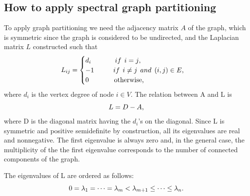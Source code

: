 \documentclass[]{usiinfbachelorproject}
\newcommand\tab[1][1cm]{\hspace*{#1}}
\begin{document}

\subsection{How to apply spectral graph partitioning}
To apply graph partitioning we need the adjacency matrix $A$ of the graph, which is symmetric since the graph is considered to be undirected, and the Laplacian matrix $L$ constructed such that
\begin{equation}\notag
L_{ij} = 
\begin{cases}
d_i \tab \:\:\: if \:\: i=j \text{,}\\
-1 \tab if \:\: i \neq j \:\: and \: \: (i,j) \in E \text{,}\\
0 \tab \:\:\:\: \text{otherwise,}
\end{cases}
\end{equation}
where $d_i$ is the vertex degree of node $i \in V$.
The relation between A and L is
\begin{equation}\notag
L = D - A \text{,}
\end{equation}
where D is the diagonal matrix having the $d_i$'s on the diagonal. Since L is symmetric and positive semidefinite by construction, all its eigenvalues are real and nonnegative. The first eigenvalue is always zero and, in the general case, the multiplicity of the the first eigenvalue corresponds to the number of connected components of the graph.

The eigenvalues of L are ordered as follows:
\begin{equation}\notag
0 = \lambda_1 = \dots = \lambda_m < \lambda_{m+1} \le \dots \leq \lambda_n \text{.}
\end{equation}
\end{document}
